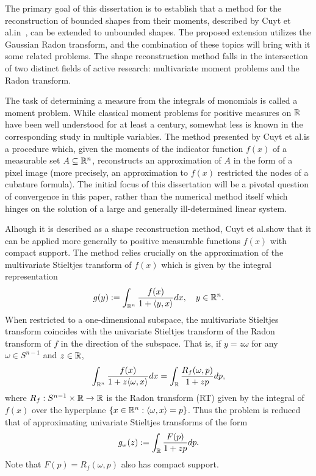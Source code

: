 

\introchapter{}{}


The primary goal of this dissertation is to establish that a method for the reconstruction of bounded shapes from their moments, described by Cuyt et al.\@ in~\cite{Cuyt05}, can be extended to unbounded shapes. The proposed extension utilizes the Gaussian Radon transform, and the combination of these topics will bring with it some related problems. The shape reconstruction method falls in the intersection of two distinct fields of active research: multivariate moment problems and the Radon transform.


The task of determining a measure from the integrals of monomials is called a moment problem. While classical moment problems for positive measures on $\mathbb{R}$ have been well understood for at least a century, somewhat less is known in the corresponding study in multiple variables. The method presented by Cuyt et al.\@ is a procedure which, given the moments of the indicator function $f(x)$ of a measurable set $A \subseteq \mathbb{R}^n$, reconstructs an approximation of $A$ in the form of a pixel image (more precisely, an approximation to $f(x)$ restricted the nodes of a cubature formula). The initial focus of this dissertation will be a pivotal question of convergence in this paper, rather than the numerical method itself which hinges on the solution of a large and generally ill-determined linear system.

Alhough it is described as a shape reconstruction method, Cuyt et al.\@ show that it can be applied more generally to positive measurable functions $f(x)$ with compact support. The method relies crucially on the approximation of the multivariate Stieltjes transform of $f(x)$ which is given by the integral representation
\[
  g(y) 
  := \int_{\mathbb{R}^n} \frac{f(x)}{1 + \langle y,x \rangle}dx, \quad y \in \mathbb{R}^n.
\]
When restricted to a one-dimensional subspace, the multivariate Stieltjes transform coincides with the univariate Stieltjes transform of the Radon transform of $f$ in the direction of the subspace. That is, if $y = z\omega$ for any $\omega \in S^{n-1}$ and $z \in \mathbb{R}$,
\[
  \int_{\mathbb{R}^n} \frac{f(x)}{1 + z\langle \omega,x \rangle} dx 
  = \int_{\mathbb{R}} \frac{R_f(\omega, p)}{1 + zp} dp,
\]
where $R_f : S^{n-1} \times \mathbb{R} \to \mathbb{R}$ is the Radon transform (RT) given by the integral of $f(x)$ over the hyperplane $\{x \in \mathbb{R}^n : \langle \omega, x \rangle = p\}$. Thus the problem is reduced that of approximating univariate Stieltjes transforms of the form
\[
  g_\omega(z) :=
  \int_{\mathbb{R}} \frac{F(p)}{1 + zp} dp.
\]
Note that $F(p) = R_f(\omega, p)$ also has compact support. 

